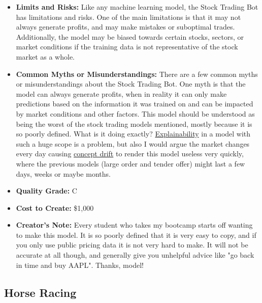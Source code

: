 \begin{itemize}
\begin{enumerate}
        \end{enumerate}
    \item \textbf{Limits and Risks:} Like any machine learning model, the Stock Trading Bot has limitations and risks. One of the main limitations is that it may not always generate profits, and may make mistakes or suboptimal trades. Additionally, the model may be biased towards certain stocks, sectors, or market conditions if the training data is not representative of the stock market as a whole.
    \item \textbf{Common Myths or Misunderstandings:} There are a few common myths or misunderstandings about the Stock Trading Bot. One myth is that the model can always generate profits, when in reality it can only make predictions based on the information it was trained on and can be impacted by market conditions and other factors. This model should be understood as being the worst of the stock trading models mentioned, mostly because it is so poorly defined. What is it doing exactly? \hyperref[sec:explain]{Explainability} in a model with such a huge scope is a problem, but also I would argue the market changes every day causing \hyperref[sec:drift]{concept drift} to render this model useless very quickly, where the previous models (large order and tender offer) might last a few days, weeks or maybe months.
    \item \textbf{Quality Grade:} C
    \item \textbf{Cost to Create:} \$1,000
    \item \textbf{Creator's Note:} Every student who takes my bootcamp starts off wanting to make this model. It is so poorly defined that it is very easy to copy, and if you only use public pricing data it is not very hard to make. It will not be accurate at all though, and generally give you unhelpful advice like "go back in time and buy AAPL". Thanks, model! 
\end{itemize}

\subsection{Horse Racing}


